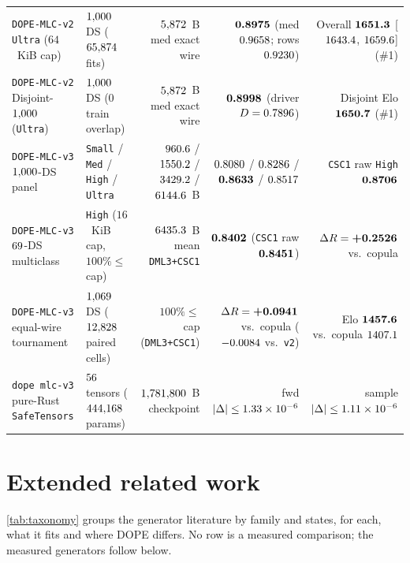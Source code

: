 \documentclass{article}
\begin{document}
\begin{table}[t]
{\begin{tabular}{@{}llrrr@{}}
\texttt{DOPE-MLC-v2} \texttt{Ultra} ($64$~KiB cap) & $1{,}000$ DS ($65{,}874$ fits) & $5{,}872$~B med exact wire & $\textbf{0.8975}$ (med $0.9658$; rows $0.9230$) & Overall $\textbf{1651.3}$ [$1643.4$, $1659.6$] (\#1) \\
\texttt{DOPE-MLC-v2} Disjoint-$1{,}000$ (\texttt{Ultra}) & $1{,}000$ DS ($0$ train overlap) & $5{,}872$~B med exact wire & $\textbf{0.8998}$ (driver $D=0.7896$) & Disjoint Elo $\textbf{1650.7}$ (\#1) \\
\midrule
\texttt{DOPE-MLC-v3} $1{,}000$-DS panel & \texttt{Small} / \texttt{Med} / \texttt{High} / \texttt{Ultra} & $960.6$ / $1550.2$ / $3429.2$ / $6144.6$~B & $0.8080$ / $0.8286$ / $\textbf{0.8633}$ / $0.8517$ & \texttt{CSC1} raw \texttt{High} $\textbf{0.8706}$ \\
\texttt{DOPE-MLC-v3} $69$-DS multiclass & \texttt{High} ($16$~KiB cap, $100\% \le$ cap) & $6435.3$~B mean \texttt{DML3+CSC1} & $\textbf{0.8402}$ (\texttt{CSC1} raw $\textbf{0.8451}$) & $\Delta R = \textbf{+0.2526}$ vs.\ copula \\
\texttt{DOPE-MLC-v3} equal-wire tournament & $1{,}069$ DS ($12{,}828$ paired cells) & $100\% \le$ cap (\texttt{DML3+CSC1}) & $\Delta R = \textbf{+0.0941}$ vs.\ copula ($-0.0084$ vs.\ \texttt{v2}) & Elo $\textbf{1457.6}$ vs.\ copula $1407.1$ \\
\texttt{dope mlc-v3} pure-Rust \texttt{SafeTensors} & $56$ tensors ($444{,}168$ params) & $1{,}781{,}800$~B checkpoint & fwd $|\Delta|\le 1.33\times 10^{-6}$ & sample $|\Delta|\le 1.11\times 10^{-6}$ \\
\bottomrule
\end{tabular}}
\end{table}

\section{Extended related work}
\label{app:related}
\cref{tab:taxonomy} groups the generator literature by family and states, for each, what it fits and where DOPE differs. No row is a measured comparison; the measured generators follow below.
\end{document}
